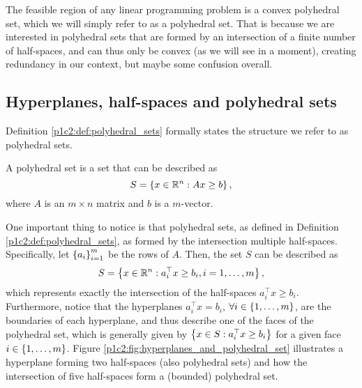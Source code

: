The feasible region of any linear programming problem is a convex polyhedral set, which we will simply refer to as a polyhedral set. That is because we are interested in polyhedral sets that are formed by an intersection of a finite number of half-spaces, and can thus only be convex (as we will see in a moment), creating redundancy in our context, but maybe some confusion overall. 

\subsection{Hyperplanes, half-spaces and polyhedral sets}

Definition \ref{p1c2:def:polyhedral_sets} formally states the structure we refer to as polyhedral sets.
%
\begin{definition} \label{p1c2:def:polyhedral_sets}
	A polyhedral set is a set that can be described as
	$$
	S = \left\{ x \in \mathbb{R}^n : Ax \geq b \right \},	
	$$
	where $A$ is an $m \times n$ matrix and $b$ is a $m$-vector.
\end{definition}
%
One important thing to notice is that polyhedral sets, as defined in Definition \ref{p1c2:def:polyhedral_sets}, as formed by the intersection multiple half-spaces. Specifically, let $\left\{ a_i \right \}_{i=1}^m$ be the rows of $A$. Then, the set $S$ can be described as 
%
\begin{equation}
	S = \left\{ x \in \mathbb{R}^n : a_i^\top x \geq b_i, i = 1,\dots, m \right \}, 	
\end{equation}
%
which represents exactly the intersection of the half-spaces $a_i^\top x \geq b_i$. Furthermore, notice that the hyperplanes $a_i^\top x = b_i$, $\forall i \in \left\{ 1,\dots, m \right \}$, are the boundaries of each hyperplane, and thus describe one of the faces of the polyhedral set, which is generally given by $\left\{ x \in S : a_i^\top x \geq b_i \right \}$ for a given face $i \in \left\{ 1,\dots, m \right \}$. Figure \ref{p1c2:fig:hyperplanes_and_polyhedral_set} illustrates a hyperplane forming two half-spaces (also polyhedral sets) and how the intersection of five half-spaces form a (bounded) polyhedral set.

